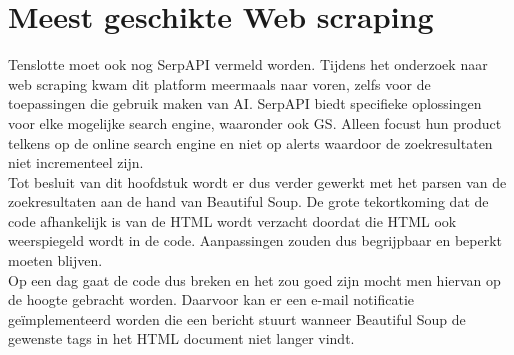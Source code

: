 \section{Meest geschikte Web scraping}
Tenslotte moet ook nog SerpAPI \autocite{Serpapi2025} vermeld worden. Tijdens het onderzoek naar web scraping kwam dit platform meermaals naar voren, zelfs voor de toepassingen die gebruik maken van AI. SerpAPI biedt specifieke oplossingen voor elke mogelijke search engine, waaronder ook GS. Alleen focust hun product telkens op de online search engine en niet op alerts waardoor de zoekresultaten niet incrementeel zijn.\\
Tot besluit van dit hoofdstuk wordt er dus verder gewerkt met het parsen van de zoekresultaten aan de hand van Beautiful Soup. De grote tekortkoming dat de code afhankelijk is van de HTML wordt verzacht doordat die HTML ook weerspiegeld wordt in de code. Aanpassingen zouden dus begrijpbaar en beperkt moeten blijven.\\
Op een dag gaat de code dus breken en het zou goed zijn mocht men hiervan op de hoogte gebracht worden. Daarvoor kan er een e-mail notificatie geïmplementeerd worden die een bericht stuurt wanneer Beautiful Soup de gewenste tags in het HTML document niet langer vindt.

